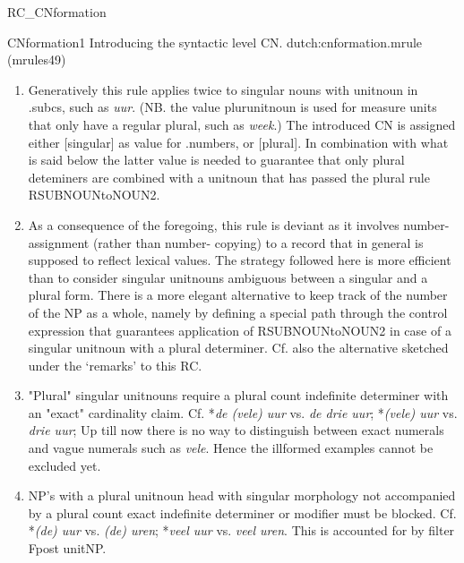 \begin{mruleclass}{RC\_CNformation}
\begin{classdescr}
\begin{enumerate}
\end{enumerate}

\nofilters

\nospeedrules

\noplannedrules

\norulesnotince


\end{classdescr}

\begin{members}
\begin{member}
 CNformation1
 Introducing the syntactic level CN.
\file dutch:cnformation.mrule (mrules49)
\semantics \nosemantics
\example
\remarks\mbox{}
\begin{enumerate}
\item Generatively this rule applies twice to singular 
nouns with unitnoun in .subcs, such as {\em uur}. (NB. the value plurunitnoun
is used for measure units that only have a regular plural, such as {\em week}.)
The introduced CN is assigned 
either [singular] as value for .numbers, or [plural].
In combination with what is said below the
latter value is needed to guarantee that only plural deteminers are 
combined with a unitnoun that has passed the plural rule RSUBNOUNtoNOUN2.
\item As a consequence of the foregoing, this 
rule is deviant as it involves number-assignment 
(rather than number-
copying) to a record that
in general is supposed to reflect lexical values. The strategy followed
here is more efficient than to
consider singular unitnouns ambiguous between a singular and a plural form.
There is a more elegant alternative to keep track of the number of the NP as a
whole, namely by defining a special path through the control expression that 
guarantees application of RSUBNOUNtoNOUN2 in case of a singular unitnoun  with 
a plural determiner. Cf. also the alternative sketched under the `remarks'
to this RC.
\item 
"Plural" singular unitnouns 
require a plural count indefinite determiner with an "exact" cardinality claim. 
Cf. 
*{\em de (vele) uur} vs. {\em de drie uur}; *{\em (vele) uur} vs. 
{\em drie uur};
Up till now there is no way to distinguish between exact numerals and vague
numerals 
such as {\em vele}. Hence the illformed examples cannot be excluded yet.
\item 
NP's with a plural unitnoun head 
with singular morphology
not accompanied by a  plural 
count exact indefinite determiner or modifier must be blocked. Cf.
*{\em (de) uur} vs. {\em (de) uren}; *{\em veel uur} vs. {\em veel uren}.
This is accounted for by filter Fpost unitNP.
 

\end{enumerate}
\end{member}
\end{members}
\end{mruleclass}

